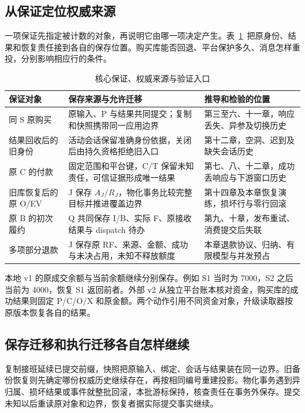 \subsection*{从保证定位权威来源}

一项保证先指定被计数的对象，再说明它由哪一项决定产生。表~\ref{tab:ch15-guarantee-path}~把原身份、结果和恢复责任接到各自的保存位置。购买库能否回退、平台保护多久、消息怎样重投，分别影响相应行的条件。

\begin{table}[htbp]
\centering\small
\caption{核心保证、权威来源与验证入口}\label{tab:ch15-guarantee-path}
\begin{tabularx}{\linewidth}{@{}p{28mm}X X@{}}
\toprule
保证对象 & 保存来源与允许迁移 & 推导和检验的位置\\
\midrule
同 S 原购买 & 原输入、P 与结果共同提交；复制和快照携带同一应用边界 & 第三至六、十一章，响应丢失、异参及切换历史\\
结果回收后的旧身份 & 活动会话保留准确身份依据，关闭后由持久资格拒绝旧入口 & 第十二章，空洞、迟到及缺失会话历史\\
原 C 的付款 & 固定范围和平台键，C/T 保留未知责任，可信证据形成唯一结果 & 第七、八、十二章，成功丢响应与下游窗口历史\\
旧库恢复后的原 O/EV & J 保存 $A_J/R_J$，物化事务比较完整目标并推进覆盖边界 & 第十四章及本章恢复演练，损坏行与零行回滚\\
原 B 的初次履约 & Q 共同保存 I/B、实际 F、原接收结果与 dispatch 待办 & 第九、十章，发布重试、消费提交后失联\\
多项部分退款 & J 保存原 RF、来源、金额、成功与未决占用，未知不释放额度 & 本章退款协议、归纳、有限模型与并发预占\\
\bottomrule
\end{tabularx}
\end{table}

本地 v1 的原成交余额与当前余额继续分别保存。例如 S1 当时为 7000，S2 之后当前为 4000，恢复 S1 返回前者。外部 v2 从独立平台账本核对资金，购买库的成功结果则固定 P/C/O/X 和原金额。两个动作引用不同资金对象，升级读取器按原版本恢复各自的结果。

\subsection*{保存迁移和执行迁移各自怎样继续}

复制接班延续已提交前缀，快照把原输入、绑定、会话与结果装在同一边界。旧备份恢复则先确定哪份权威历史继续存在，再按相同编号重建投影。物化事务遇到异归属、损坏结果或事件就整批回滚，本批游标保持，核查责任在事务外保存。提交未知以后重读原对象和边界，恢复者据实际提交事实继续。


